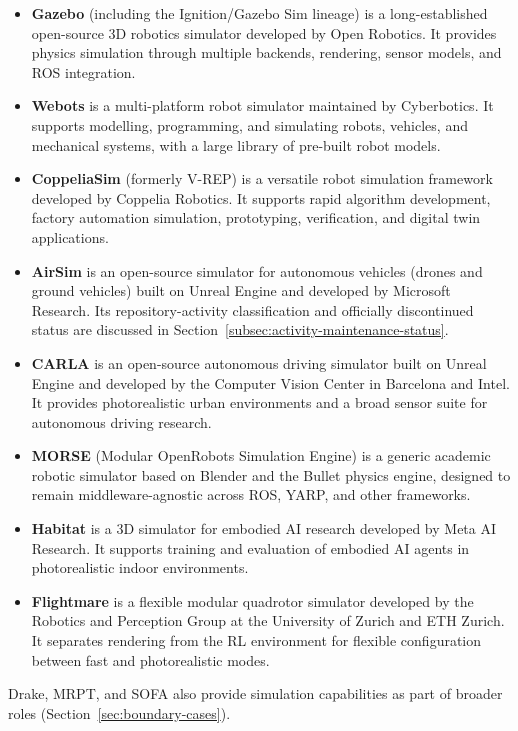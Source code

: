 \begin{itemize}
    \item \textbf{Gazebo} (including the Ignition/Gazebo Sim lineage) is a long-established open-source 3D robotics simulator developed by Open Robotics. It provides physics simulation through multiple backends, rendering, sensor models, and ROS integration.
    \item \textbf{Webots} is a multi-platform robot simulator maintained by Cyberbotics. It supports modelling, programming, and simulating robots, vehicles, and mechanical systems, with a large library of pre-built robot models.
    \item \textbf{CoppeliaSim} (formerly V-REP) is a versatile robot simulation framework developed by Coppelia Robotics. It supports rapid algorithm development, factory automation simulation, prototyping, verification, and digital twin applications.
    \item \textbf{AirSim} is an open-source simulator for autonomous vehicles (drones and ground vehicles) built on Unreal Engine and developed by Microsoft Research. Its repository-activity classification and officially discontinued status are discussed in Section~\ref{subsec:activity-maintenance-status}.
    \item \textbf{CARLA} is an open-source autonomous driving simulator built on Unreal Engine and developed by the Computer Vision Center in Barcelona and Intel. It provides photorealistic urban environments and a broad sensor suite for autonomous driving research.
    \item \textbf{MORSE} (Modular OpenRobots Simulation Engine) is a generic academic robotic simulator based on Blender and the Bullet physics engine, designed to remain middleware-agnostic across ROS, YARP, and other frameworks.
    \item \textbf{Habitat} is a 3D simulator for embodied AI research developed by Meta AI Research. It supports training and evaluation of embodied AI agents in photorealistic indoor environments.
    \item \textbf{Flightmare} is a flexible modular quadrotor simulator developed by the Robotics and Perception Group at the University of Zurich and ETH Zurich. It separates rendering from the RL environment for flexible configuration between fast and photorealistic modes.
\end{itemize}

Drake, MRPT, and SOFA also provide simulation capabilities as part of broader roles (Section~\ref{sec:boundary-cases}).

